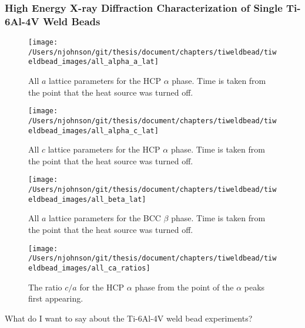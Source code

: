 \subsubsection{High Energy X-ray Diffraction Characterization of Single Ti-6Al-4V Weld Beads}
\begin{figure}
	\texttt{[image: /Users/njohnson/git/thesis/document/chapters/tiweldbead/tiweldbead\_images/all\_alpha\_a\_lat]}
	\caption{All $a$ lattice parameters for the HCP $\alpha$ phase. Time is taken from the point that the heat source was turned off.}
	\label{all_alpha_a_lat}
\end{figure}
%
\begin{figure}
	\texttt{[image: /Users/njohnson/git/thesis/document/chapters/tiweldbead/tiweldbead\_images/all\_alpha\_c\_lat]}
	\caption{All $c$ lattice parameters for the HCP $\alpha$ phase. Time is taken from the point that the heat source was turned off.}
	\label{all_alpha_c_lat}
\end{figure}
%
\begin{figure}
	\texttt{[image: /Users/njohnson/git/thesis/document/chapters/tiweldbead/tiweldbead\_images/all\_beta\_lat]}
	\caption{All $a$ lattice parameters for the BCC $\beta$ phase. Time is taken from the point that the heat source was turned off.}
	\label{all_beta_lat}
\end{figure}
%
\begin{figure}
	\texttt{[image: /Users/njohnson/git/thesis/document/chapters/tiweldbead/tiweldbead\_images/all\_ca\_ratios]}
	\caption{The ratio $c/a$ for the HCP $\alpha$ phase from the point of the $\alpha$ peaks first appearing.}
	\label{all_ca_ratios}
\end{figure}

What do I want to say about the Ti-6Al-4V weld bead experiments?
